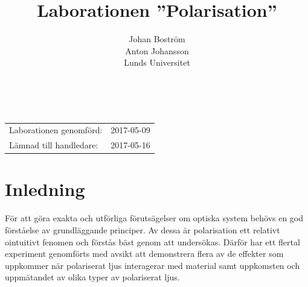 \documentclass[a4paper]{article}
\title{Laborationen ”Polarisation”}
\author{Johan Boström\\Anton Johansson\\Lunds Universitet}
\makeatletter
\renewcommand*\maketitle{
  {
    \begin{center}
      {\huge\bfseries \@title}\\
      \vspace{5mm}
      {\large \@author}
    \end{center}
    \vspace{2mm}
  }
}
\makeatother
\begin{document}
\maketitle

\renewcommand{\abstractname}{Abstract} %

  

\vspace{2mm}

\hspace{-3mm}
\begin{tabular}{ll}
Laborationen genomförd: &	2017-05-09 \\
Lämnad till handledare: &	2017-05-16 \\
\end{tabular}

\vspace{3mm}

\section{Inledning}

%

För att göra exakta och utförliga förutsägelser om optiska system behövs en god förståelse av grundläggande principer. Av dessa är polarisation ett relativt ointuitivt fenomen och förstås bäst genom att undersökas. Därför har ett flertal experiment genomförts med avsikt att demonstrera flera av de effekter som uppkommer när polariserat ljus interagerar med material samt uppkomsten och uppmätandet av olika typer av polariserat ljus.
\end{document}

